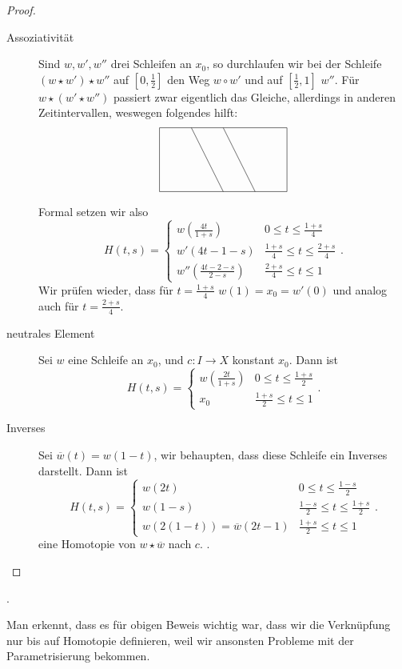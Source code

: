 \begin{proof}
    \begin{description}
        \item[Assoziativität] Sind $w,w',w''$ drei Schleifen an  $x_0$, so durchlaufen wir bei der Schleife $(w \star w') \star w''$ auf $[0,\frac{1}{2}]$ den Weg $w \circ  w'$ und auf $[\frac{1}{2},1]$ $w''$. Für $w \star (w' \star w'')$  passiert zwar eigentlich das Gleiche, allerdings in anderen Zeitintervallen, weswegen folgendes hilft:
\[
            \begin{tikzpicture}
                \draw (0,0) -- (4,0) -- (4,2) -- (0,2) -- cycle;
                \draw (1,2) -- (2,0);
                \draw (2,2) -- (3,0);
            \end{tikzpicture}
        \]
    Formal setzen wir also
    \[
        H(t,s) = \begin{cases}
            w\left( \frac{4t}{1+s} \right) & 0 \leq  t \leq  \frac{1+s}{4} \\
            w'(4t-1-s) & \frac{1+s}{4}\leq t \leq  \frac{2+s}{4} \\
            w''\left( \frac{4t-2-s}{2-s} \right) & \frac{2+s}{4}\leq t\leq 1
        \end{cases}
    .\] 
    Wir prüfen wieder, dass für $t = \frac{1+s}{4}$ $w(1) = x_0 = w'(0)$ und analog auch für $t = \frac{2+s}{4}$.
\item[neutrales Element] Sei $w$ eine Schleife an $x_0$, und $c\colon  I \to  X$ konstant $x_0$. Dann ist
    \[
        H(t,s) = \begin{cases}
            w(\frac{2t}{1+s}) & 0 \leq  t\leq \frac{1+s}{2} \\
           x_0 & \frac{1+s}{2}\leq t\leq 1
        \end{cases}
    .\] 
\item[Inverses] Sei $\overline{w} (t) = w(1-t)$, wir behaupten, dass diese Schleife ein Inverses darstellt. Dann ist
    \[
        H(t,s) = \begin{cases}
            w(2t) & 0 \leq  t \leq  \frac{1-s}{2} \\
            w(1-s) & \frac{1-s}{2} \leq  t \leq  \frac{1+s}{2} \\
            w(2(1-t)) = \overline{w}(2t-1) & \frac{1+s}{2}\leq  t \leq  1
        \end{cases}
    .\] 
    eine Homotopie von $w \star \overline{w}$ nach $c$.
    .
    \end{description}
\end{proof}
.
\begin{oral}
    Man erkennt, dass es für obigen Beweis wichtig war, dass wir die Verknüpfung nur bis auf Homotopie definieren, weil wir ansonsten Probleme mit der Parametrisierung bekommen.
\end{oral}

